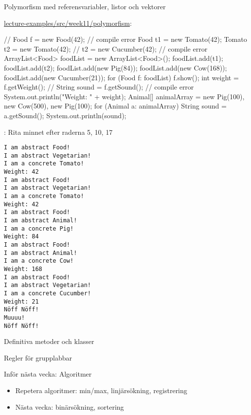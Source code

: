 \documentclass{lecturenotes}
\begin{document}
\begin{Slide}{Polymorfism med referensvariabler, listor och vektorer}
  \begin{minipage}{0.6\linewidth}   
\footnotesize\href{https://github.com/bjornregnell/lth-eda016-2015/tree/master/lectures/examples/eclipse-ws/lecture-examples/src/week11/polymorfism}{lecture-examples/src/week11/polymorfism}:


\begin{Code}[basicstyle=\ttfamily\fontsize{6}{7}\selectfont, numberstyle=,numbers=left]
// Food f = new Food(42);   // compile error
Food t1 = new Tomato(42);
Tomato t2 = new Tomato(42); 
// t2 = new Cucumber(42);   // compile error
ArrayList<Food> foodList = new ArrayList<Food>();
foodList.add(t1);
foodList.add(t2);
foodList.add(new Pig(84));
foodList.add(new Cow(168));
foodList.add(new Cucumber(21));
for (Food f: foodList){
    f.show();
    int weight = f.getWeight();
    // String sound = f.getSound(); // compile error
    System.out.println("Weight: " + weight);
}
Animal[] animalArray = 
    {new Pig(100), new Cow(500), new Pig(100)};
for (Animal a: animalArray){
    String sound = a.getSound();
    System.out.println(sound);
}
\end{Code}
: Rita minnet efter raderna 5, 10, 17
\end{minipage}
\hspace{0.5cm}
\begin{minipage}[]{0.2\linewidth}  \fontsize{7}{8}\selectfont
\begin{verbatim}
I am abstract Food!
I am abstract Vegetarian!
I am a concrete Tomato!
Weight: 42
I am abstract Food!
I am abstract Vegetarian!
I am a concrete Tomato!
Weight: 42
I am abstract Food!
I am abstract Animal!
I am a concrete Pig!
Weight: 84
I am abstract Food!
I am abstract Animal!
I am a concrete Cow!
Weight: 168
I am abstract Food!
I am abstract Vegetarian!
I am a concrete Cucumber!
Weight: 21
Nöff Nöff!
Muuuu!
Nöff Nöff!
\end{verbatim}
  \end{minipage}
\end{Slide}

\begin{Slide}{Definitiva metoder och klasser}
\end{Slide}

\begin{Slide}{Regler för grupplabbar}
\end{Slide}

\begin{Slide}{Inför nästa vecka: Algoritmer}
\begin{itemize}
\item Repetera algoritmer: min/max, linjärsökning, registrering
\item Nästa vecka: binärsökning, sortering
\end{itemize}
\end{Slide}
\end{document}
